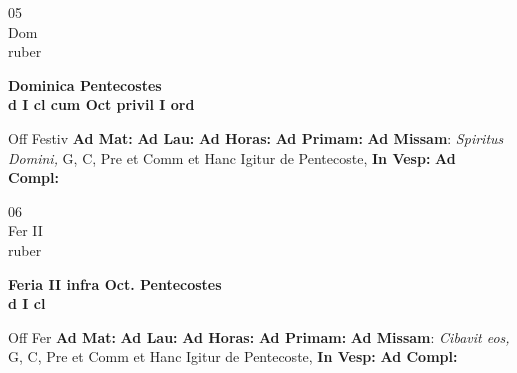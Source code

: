 \documentclass[10pt, openany]{book}
\begin{document}
    \begin{center}
        \begin{minipage}{3.5in}
            \vspace{2em}
            \begin{minipage}{0.5in}
                {\Huge 05} \\
                {\normalsize Dom} \\
                {\normalsize ruber}
            \end{minipage}
            \begin{minipage}{3.0in}
                \textbf{ \large Dominica Pentecostes \\
                \textnormal{\normalsize d I cl cum Oct privil I ord}} \\ 
            \end{minipage}
            \begin{justify}Off Festiv
                \textbf{Ad Mat: }
                \textbf{Ad Lau: }
                \textbf{Ad Horas: }
                \textbf{Ad Primam: }\textbf{Ad Missam}: \textit{Spiritus Domini,} G, C, Pre et Comm et Hanc Igitur de Pentecoste,  
                \textbf{In Vesp: }
                \textbf{Ad Compl: }
            \end{justify}
        \end{minipage}
    \end{center}

    \begin{center}
        \begin{minipage}{3.5in}
            \vspace{2em}
            \begin{minipage}{0.5in}
                {\Huge 06} \\
                {\normalsize Fer II} \\
                {\normalsize ruber}
            \end{minipage}
            \begin{minipage}{3.0in}
                \textbf{ \large Feria II infra Oct. Pentecostes \\
                \textnormal{\normalsize d I cl}} \\ 
            \end{minipage}
            \begin{justify}Off Fer
                \textbf{Ad Mat: }
                \textbf{Ad Lau: }
                \textbf{Ad Horas: }
                \textbf{Ad Primam: }\textbf{Ad Missam}: \textit{Cibavit eos,} G, C, Pre et Comm et Hanc Igitur de Pentecoste,  
                \textbf{In Vesp: }
                \textbf{Ad Compl: }
            \end{justify}
        \end{minipage}
    \end{center}
\end{document}
